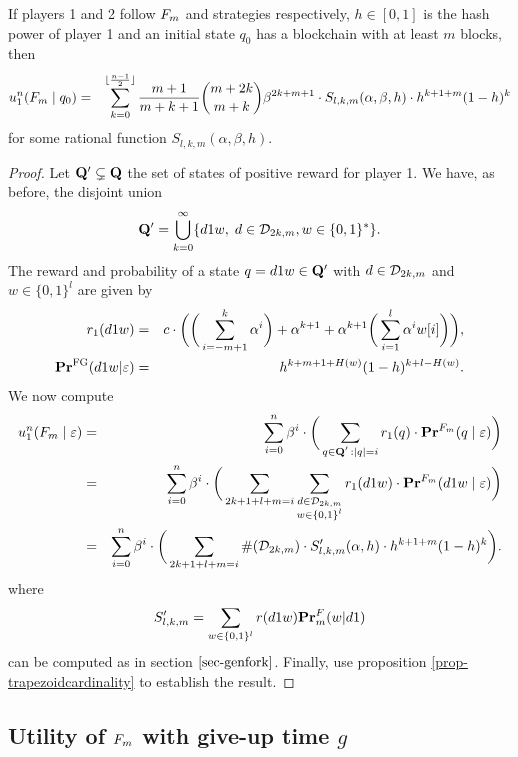 \begin{myprop*}
If players 1 and 2 follow $F_m$ and \df strategies respectively, $h\in [0,1]$ is the hash power of player 1 and an initial state $q_0$ has a blockchain with at least $m$ blocks, then
\begin{eqnarray*}
	u_1^n(F_m \mid q_0) & = & \sum_{k=0}^{\lfloor\frac{n-1}{2}\rfloor}\frac{m+1}{m+k+1}{m+2k\choose m+k}\beta^{2k+m+1}  \cdot S_{l,k,m}(\alpha,\beta,h)\cdot h^{k+1+m}(1-h)^{k}
\end{eqnarray*}
for some rational function $S_{l,k,m}(\alpha,\beta,h)$.

\end{myprop*}
\begin{proof}
	Let $\mathbf{Q}'\subsetneq \mathbf{Q}$ the set of states of positive reward for player 1. We have, as before, the disjoint union
	$$\mathbf{Q}' = \bigcup_{k=0}^\infty \{d1w,\; d\in\mathcal{D}_{2k,m}, w\in\{0,1\}^\ast\}.$$
	The reward and probability of a state $q=d1w\in \mathbf{Q}'$ with $d\in\mathcal{D}_{2k,m}$ and $w\in\{0,1\}^l$ are given by
\begin{eqnarray*}
	r_1(d1w) &=& c\cdot \bigg(\bigg(\sum_{i=-m+1}^{k}\alpha^i \bigg)+\alpha^{k+1}+\alpha^{k+1}\bigg(\sum_{i=1}^{l}\alpha^i w[i]\bigg)\bigg),\\
	\mathbf{Pr}^{\text{\rm FG}}(d1w|\varepsilon) &=& h^{k+m+1+H(w)}(1-h)^{k+l-H(w)}.
\end{eqnarray*} 
We now compute
\begin{eqnarray*}
	u_1^n(F_m \mid \varepsilon) & = & \sum_{i=0}^{n}\beta^{i} \cdot  \bigg(\sum_{\substack{q \in \mathbf{Q}' \,: |q| = i}} r_1(q) \cdot 
	\mathbf{Pr}^{F_m}(q \mid \varepsilon)\bigg)\\
								   & = & \sum_{i=0}^{n}\beta^{i} \cdot  \bigg(\sum_{2k+1+l+m=i}\sum_{\substack{d\in \mathcal{D}_{2k,m}\\w\in\{0,1\}^l}} r_1(d1w) \cdot 
	\mathbf{Pr}^{F_m}(d1w \mid \varepsilon)\bigg)\\
								   & = & \sum_{i=0}^{n}\beta^{i} \cdot  \bigg(\sum_{2k+1+l+m=i} \#(\mathcal{D}_{2k,m})\cdot S'_{l,k,m}(\alpha,h)\cdot h^{k+1+m}(1-h)^{k}\bigg).
\end{eqnarray*}
where
$$S'_{l,k,m}=\sum_{w\in\{0,1\}^l}r(d1w)\mathbf{Pr}^F_m(w|d1)$$
can be computed as in section $\ref{sec-genfork}$. Finally, use proposition \ref{prop-trapezoidcardinality} to establish the result.
\end{proof}

\subsection{Utility of $F_m$ with give-up time $g$}

